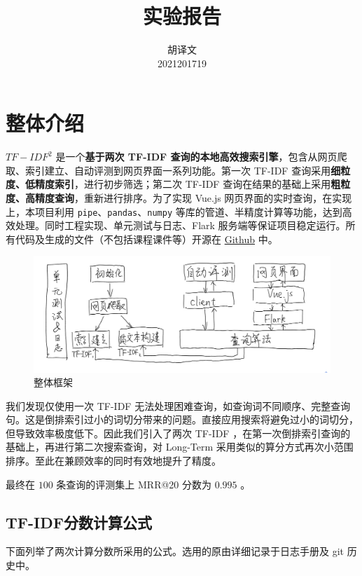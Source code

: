 \documentclass{ctexart}
\title{实验报告}
\author{胡译文 \\ 2021201719}
\begin{document}
\maketitle



\section{整体介绍}

$TF-IDF^2$ 是一个\textbf{基于两次 TF-IDF 查询的本地高效搜索引擎}，包含从网页爬取、索引建立、自动评测到网页界面一系列功能。第一次 TF-IDF 查询采用\textbf{细粒度、低精度索引}，进行初步筛选；第二次 TF-IDF 查询在结果的基础上采用\textbf{粗粒度、高精度查询}，重新进行排序。为了实现 Vue.js 网页界面的实时查询，在实现上，本项目利用 \verb|pipe|、\verb|pandas|、\verb|numpy| 等库的管道、半精度计算等功能，达到高效处理。同时工程实现、单元测试与日志、Flark 服务端等保证项目稳定运行。所有代码及生成的文件（不包括课程课件等）开源在 \href{https://github.com/huyiwen/search_engine}{Github} 中。

\begin{figure}[h]
	\centering
	\includegraphics[width=0.8\columnwidth]{framework.jpg}
	\caption{整体框架}
\end{figure}

我们发现仅使用一次 TF-IDF 无法处理困难查询，如查询词不同顺序、完整查询句。这是倒排索引过小的词切分带来的问题。直接应用搜索将避免过小的词切分，但导致效率极度低下。因此我们引入了两次 TF-IDF ，在第一次倒排索引查询的基础上，再进行第二次搜索查询，对 Long-Term 采用类似的算分方式再次小范围排序。至此在兼顾效率的同时有效地提升了精度。

最终在 $100$ 条查询的评测集上 MRR@20 分数为 $0.995$ 。



\subsection{TF-IDF分数计算公式}

下面列举了两次计算分数所采用的公式。选用的原由详细记录于日志手册及 git 历史中。
\end{document}
